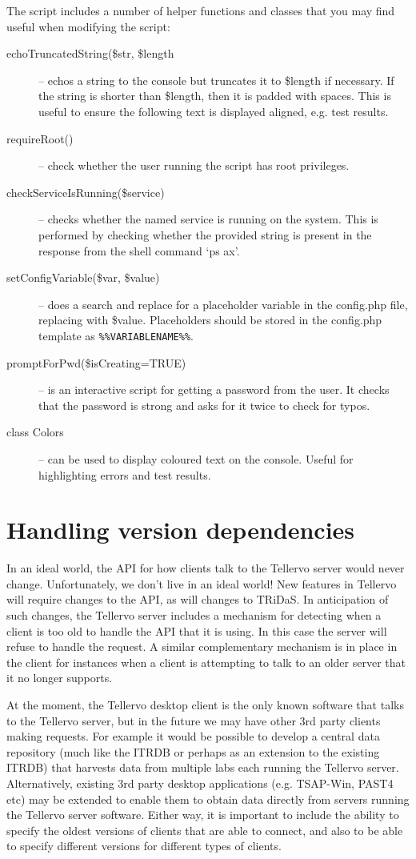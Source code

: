 The script includes a number of helper functions and classes that you may find useful when modifying the script:

\begin{description}
 \item[echoTruncatedString(\$str, \$length] -- echos a string to the console but truncates it to \$length if necessary.  If the string is shorter than \$length, then it is padded with spaces.  This is useful to ensure the following text is displayed aligned, e.g. test results.
 \item[requireRoot()] -- check whether the user running the script has root privileges.
 \item[checkServiceIsRunning(\$service)] -- checks whether the named service is running on the system.  This is performed by checking whether the provided string is present in the response from the shell command `ps ax'.
 \item[setConfigVariable(\$var, \$value)] -- does a search and replace for a placeholder variable in the config.php file, replacing with \$value.  Placeholders should be stored in the config.php template as \verb|%%VARIABLENAME%%|.
 \item[promptForPwd(\$isCreating=TRUE)] -- is an interactive script for getting a password from the user.  It checks that the password
 is strong and asks for it twice to check for typos. 
 \item[class Colors] -- can be used to display coloured text on the console.  Useful for highlighting errors and test results.

\end{description}

\section{Handling version dependencies}
In an ideal world, the API for how clients talk to the Tellervo server would never change.  Unfortunately, we don't live in an ideal world!  New features in Tellervo will require changes to the API, as will changes to TRiDaS.  In anticipation of such changes, the Tellervo server includes a mechanism for detecting when a client is too old to handle the API that it is using.  In this case the server will refuse to handle the request.  A similar complementary mechanism is in place in the client for instances when a client is attempting to talk to an older server that it no longer supports.  

At the moment, the Tellervo desktop client is the only known software that talks to the Tellervo server, but in the future we may have other 3rd party clients making requests.  For example it would be possible to develop a central data repository (much like the ITRDB or perhaps as an extension to the existing ITRDB) that harvests data from multiple labs each running the Tellervo server. Alternatively, existing 3rd party desktop applications (e.g. TSAP-Win, PAST4 etc) may be extended to enable them to obtain data directly from servers running the Tellervo server software.  Either way, it is important to include the ability to specify the oldest versions of clients that are able to connect, and also to be able to specify different versions for different types of clients. 

